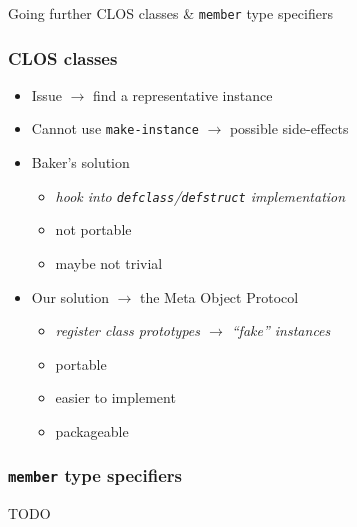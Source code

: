 \documentclass[aspectratio=169]{beamer}
\renewcommand\code[1]{\texttt{#1}}
\newcommand\rarr{\ensuremath{\rightarrow}}
\newcommand\Rarr{\ensuremath{\Rightarrow}}
\newcommand\plus{{\color{watchOS-blue}\faPlus}}
\newcommand\minus{{\color{watchOS-red}\faMinus}}
\begin{document}
\begin{sectionframe}{Going further}
  CLOS classes \& \code{member} type specifiers
\end{sectionframe}

\begin{frame}
  \frametitle{CLOS classes}

  \begin{itemize}
  \item Issue \rarr{} find a representative instance
  \item Cannot use \code{make-instance} \rarr{} possible side-effects
    \pause
  \item Baker's solution
    \begin{itemize}
    \item \emph{hook into \code{defclass}/\code{defstruct} implementation}
    \item[\tiny\minus] not portable
    \item[\tiny\minus] maybe not trivial
    \end{itemize}
  \end{itemize}

  \pause

  \begin{itemize}
  \item Our solution \rarr{} the Meta Object Protocol
    \begin{itemize}
    \item \emph{register class prototypes \rarr{} ``fake'' instances}
    \item[\tiny\plus] portable
    \item[\tiny\plus] easier to implement
    \item[\tiny\plus] packageable
    \end{itemize}
  \end{itemize}
\end{frame}

\begin{frame}[fragile]
  \frametitle{\code{member} type specifiers}
  TODO
\end{frame}

\end{document}

